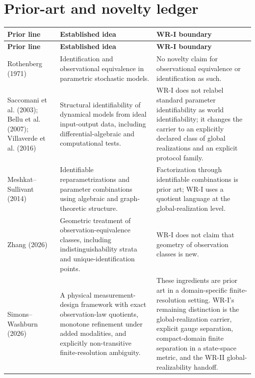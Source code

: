 \documentclass[11pt]{article}
\begin{document}
\section{Prior-art and novelty ledger}

\begin{longtable}{>{\raggedright\arraybackslash}p{}
                  >{\raggedright\arraybackslash}p{}
                  >{\raggedright\arraybackslash}p{}}
\toprule
\textbf{Prior line} & \textbf{Established idea} & \textbf{WR-I boundary} \\
\midrule
\endfirsthead
\toprule
\textbf{Prior line} & \textbf{Established idea} & \textbf{WR-I boundary} \\
\midrule
\endhead

Rothenberg (1971) &
Identification and observational equivalence in parametric stochastic models. &
No novelty claim for observational equivalence or identification as such. \\[5pt]

Saccomani et al. (2003); Bellu et al. (2007); Villaverde et al. (2016) &
Structural identifiability of dynamical models from ideal input-output data,
including differential-algebraic and computational tests. &
WR-I does not relabel standard parameter identifiability as world
identifiability; it changes the carrier to an explicitly declared class of
global realizations and an explicit protocol family. \\[5pt]

Meshkat--Sullivant (2014) &
Identifiable reparametrizations and parameter combinations using algebraic and
graph-theoretic structure. &
Factorization through identifiable combinations is prior art; WR-I uses a
quotient language at the global-realization level. \\[5pt]

Zhang (2026) &
Geometric treatment of observation-equivalence classes, including
indistinguishability strata and unique-identification points. &
WR-I does not claim that geometry of observation classes is new. \\[5pt]

Simons--Washburn (2026) &
A physical measurement-design framework with exact observation-law quotients,
monotone refinement under added modalities, and explicitly non-transitive
finite-resolution ambiguity. &
These ingredients are prior art in a domain-specific finite-resolution setting.
WR-I's remaining distinction is the global-realization carrier, explicit gauge
separation, compact-domain finite separation in a state-space metric, and the
WR-II global-realizability handoff. \\[5pt]


\end{longtable}
\end{document}

